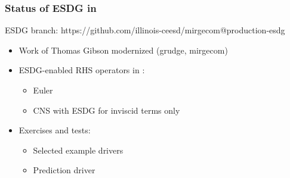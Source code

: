 \begin{frame}\frametitle{Status of ESDG in \mirgecom{}}
\vspace{15pt}
\begin{center}
\mirgecom{} ESDG branch: https://github.com/illinois-ceesd/mirgecom@production-esdg
\end{center}
\begin{itemize}
\item Work of Thomas Gibson modernized (grudge, mirgecom)
\item ESDG-enabled RHS operators in \mirgecom{}:
\begin{itemize}
\item Euler
\item CNS with ESDG for inviscid terms only
\end{itemize}
\item Exercises and tests:
\begin{itemize}
\item Selected \mirgecom{} example drivers
\item Prediction driver
\end{itemize}
\end{itemize}
\end{frame}

